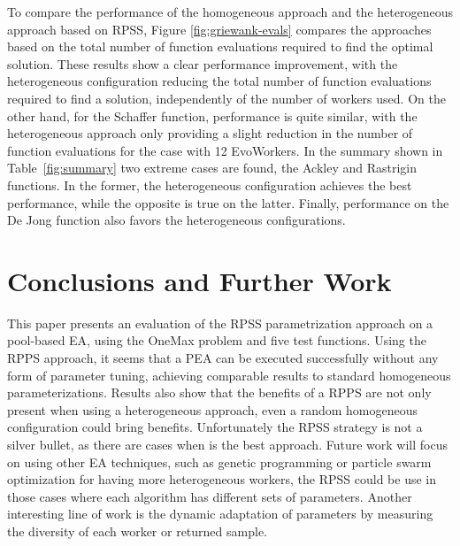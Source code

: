 \documentclass{llncs}
\begin{document}
To compare the performance of the homogeneous approach and the heterogeneous approach based on RPSS,
Figure \ref{fig:griewank-evals} compares the approaches based on the total number of function 
evaluations required to find the optimal solution.
These results show a clear performance improvement, with the heterogeneous configuration 
reducing the total number of function evaluations required to find a solution,
independently of the number of workers used.
On the other hand, for the Schaffer function, performance is quite similar,
with the heterogeneous approach only providing a slight reduction in the number 
of function evaluations for the case with 12 EvoWorkers.
In the summary shown in Table~\ref{fig:summary} two extreme cases are found, the Ackley and Rastrigin functions.
In the former, the heterogeneous configuration achieves the best performance, while the opposite is true on the latter.
Finally, performance on the De Jong function also favors the heterogeneous configurations.

\section{Conclusions and Further Work}
\label{sec:conclusions}
This paper presents an evaluation of the RPSS parametrization approach on 
a pool-based EA, using the OneMax problem and five test functions. 
Using the RPPS approach, it seems that a PEA can be executed successfully 
without any form of parameter tuning, achieving comparable results to standard homogeneous
parameterizations. Results also show that the benefits of a RPPS are not only present
when using a heterogeneous approach, even a random homogeneous configuration could bring
benefits. Unfortunately the RPSS strategy is not a silver bullet, as there are cases
when is the best approach. Future work will focus on using other EA techniques, 
such as genetic programming or particle swarm optimization for having more heterogeneous
workers, the RPSS could be use in those cases where each algorithm has different sets of
parameters. Another interesting line of work is the dynamic adaptation of parameters by
measuring the diversity of each worker or returned sample.   




\end{document}

